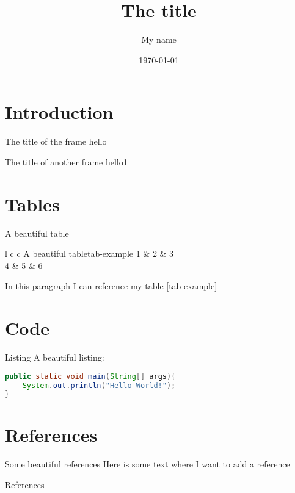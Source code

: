 \documentclass[aspectratio=169]{beamer}
\title{The title}
\author{My name}
\date{\today}
\begin{document}
\titleframe

\section{Introduction}

\begin{frame}{The title of the frame}
	hello
\end{frame}


\begin{frame}{The title of another frame}
	hello1
\end{frame}

\section{Tables}

\begin{frame}{A beautiful table}

	\begin{customtable}{l c c }{A beautiful table}{tab-example}
		1 & 2 & 3 \\
		4 & 5 & 6 \\
	\end{customtable}

	In this paragraph I can reference my table \ref{tab-example}

\end{frame}

\section{Code}

\begin{frame}[fragile]{Listing}
	\large
	A beautiful listing:

\begin{lstlisting}[language=Java]
public static void main(String[] args){
	System.out.println("Hello World!");
}
\end{lstlisting}

\end{frame}

\section{References}

\begin{frame}{Some beautiful references}
	Here is some text where I want to add a reference \cite{Dittrich19}
\end{frame}

\begin{frame}{References}
    
    
\end{frame}
\end{document}
